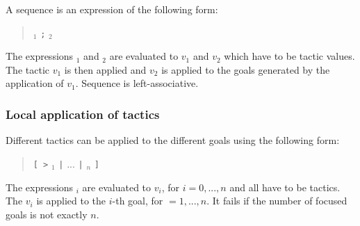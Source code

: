 A sequence is an expression of the following form:
\begin{quote}
{\tacexpr}$_1$ {\tt ;} {\tacexpr}$_2$
\end{quote}
The expressions {\tacexpr}$_1$ and {\tacexpr}$_2$ are evaluated
to $v_1$ and $v_2$ which have to be tactic values. The tactic $v_1$ is
then applied and $v_2$ is applied to the goals generated by the
application of $v_1$. Sequence is left-associative.

\subsubsection[Local application of tactics]{Local application of tactics\tacindex{[>\ldots$\mid$\ldots$\mid$\ldots]}\tacindex{;[\ldots$\mid$\ldots$\mid$\ldots]}}

Different tactics can be applied to the different goals using the following form:
\begin{quote}
{\tt [ >} {\tacexpr}$_1$ {\tt |} $...$ {\tt |} {\tacexpr}$_n$ {\tt ]}
\end{quote}
The expressions {\tacexpr}$_i$ are evaluated to $v_i$, for $i=0,...,n$
and all have to be tactics. The $v_i$ is applied to the $i$-th goal,
for $=1,...,n$. It fails if the number of focused goals is not exactly $n$.

